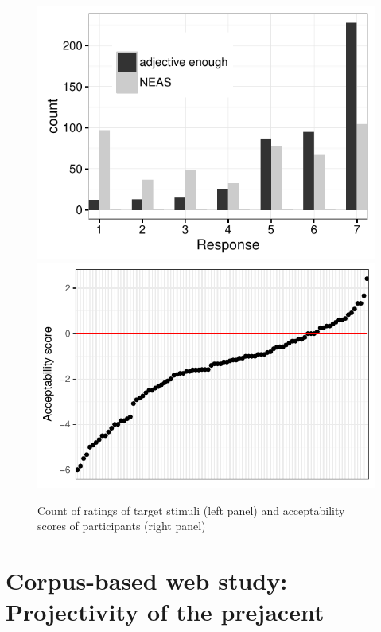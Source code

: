 \documentclass[11pt,fleqn]{article}
\newcommand{\6}{\mbox{$[\hspace*{-.6mm}[$}}
\newcommand{\9}{\mbox{$]\hspace*{-.6mm}]$}}
\begin{document}
\begin{figure}[h!]

\hspace*{-.5cm}\includegraphics[scale=.8]{../acceptability-rating-study/graphs/histogram} \includegraphics[scale=.8]{../acceptability-rating-study/graphs/acceptability-rating-difference}


\caption{Count of ratings of target stimuli (left panel) and acceptability scores of participants (right panel)}\label{f-acc}

\end{figure}

\section{Corpus-based web study: Projectivity of the prejacent}\label{a-corpus}
\end{document}
